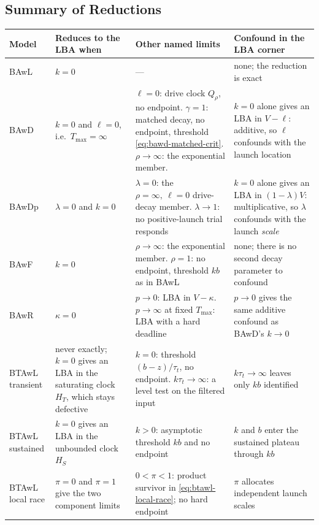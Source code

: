 \documentclass[12pt]{article}
\theoremstyle{remark}
\begin{document}
\subsection{Summary of Reductions}
\begin{center}
\small
\begin{tabular}{L{0.075\textwidth}L{0.185\textwidth}L{0.27\textwidth}L{0.29\textwidth}}
\toprule
Model & Reduces to the LBA when & Other named limits & Confound in the LBA
corner \\
\midrule
BAwL & $k=0$ & --- & none; the reduction is exact \\
\addlinespace
BAwD & $k=0$ and $\ell=0$, i.e.\ $T_{\max}=\infty$ &
$\ell=0$: drive clock $Q_\rho$, no endpoint. $\gamma=1$: matched decay, no
endpoint, threshold \eqref{eq:bawd-matched-crit}. $\rho\to\infty$: the
exponential member. &
$k=0$ alone gives an LBA in $V-\ell$: additive, so $\ell$ confounds with the
launch location \\
\addlinespace
BAwDp & $\lambda=0$ and $k=0$ &
$\lambda=0$: the $\rho=\infty,\ \ell=0$ drive-decay member. $\lambda\to1$: no
positive-launch trial responds &
$k=0$ alone gives an LBA in $(1-\lambda)V$: multiplicative, so $\lambda$
confounds with the launch \emph{scale} \\
\addlinespace
BAwF & $k=0$ &
$\rho\to\infty$: the exponential member. $\rho=1$: no endpoint, threshold
$kb$ as in BAwL &
none; there is no second decay parameter to confound \\
\addlinespace
BAwR & $\kappa=0$ &
$p\to0$: LBA in $V-\kappa$. $p\to\infty$ at fixed $T_{\max}$: LBA with a hard
deadline &
$p\to0$ gives the same additive confound as BAwD's $k\to0$ \\
\addlinespace
BTAwL transient & never exactly; $k=0$ gives an LBA in the saturating clock
$H_T$, which stays defective &
$k=0$: threshold $(b-z)/\tau_t$, no endpoint.
$k\tau_t\to\infty$: a level test on the filtered input &
$k\tau_t\to\infty$ leaves only $kb$ identified \\
\addlinespace
BTAwL sustained & $k=0$ gives an LBA in the unbounded clock $H_S$ &
$k>0$: asymptotic threshold $kb$ and no endpoint &
$k$ and $b$ enter the sustained plateau through $kb$ \\
\addlinespace
BTAwL local race & $\pi=0$ and $\pi=1$ give the two component limits &
$0<\pi<1$: product survivor in \eqref{eq:btawl-local-race}; no hard endpoint &
$\pi$ allocates independent launch scales \\
\bottomrule
\end{tabular}


\end{center}
\end{document}
